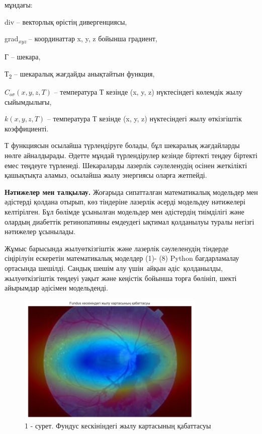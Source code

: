 \begin{multicols}{2}
мұндағы:

div -- векторлық өрістің дивергенциясы,

grad\emph{\textsubscript{xyz}} -- координаттар x, y, z бойынша градиент,

Г -- шекара,

Т\textsubscript{2} -- шекаралық жағдайды анықтайтын функция,

\(C_{o\sigma}(x,y,z,T)\) -- температура Т кезінде (x, y, z) нүктесіндегі
көлемдік жылу сыйымдылығы,

\(k(x,y,z,T)\) -- температура Т кезінде (x, y, z) нүктесіндегі жылу
өткізгіштік коэффициенті.

Т функциясын осылайша түрлендіруге болады, бұл шекаралық жағдайларды
нөлге айналдырады. Әдетте мұндай түрлендірулер кезінде біртекті теңдеу
біртекті емес теңдеуге түрленеді. Шекараларды лазерлік сәулеленудің
осінен жеткілікті қашықтықта аламыз, осылайша жылу энергиясы оларға
жетпейді.

{\bfseries Нәтижелер мен талқылау.} Жоғарыда сипатталған математикалық
модельдер мен әдістерді қолдана отырып, көз тіндеріне лазерлік әсерді
модельдеу нәтижелері келтірілген. Бұл бөлімде ұсынылған модельдер мен
әдістердің тиімділігі және олардың диабеттік ретинопатияны емдеудегі
ықтимал қолданылуы туралы негізгі нәтижелер ұсынылады.

Жұмыс барысында жылуөткізгіштік және лазерлік сәулеленудің тіндерде
сіңірілуін ескеретін математикалық моделдер (1)- (8) Python
бағдарламалау ортасында шешілді. Сандық шешім алу үшін~айқын
әдіс~қолданылды, жылуөткізгіштік теңдеуі уақыт және кеңістік бойынша
торға бөлініп, шекті айырымдар әдісімен модельденді.
\end{multicols}

\begin{figure}[H]
	\centering
	\includegraphics[width=0.8\textwidth]{media/ict/image20}
	\caption*{1 - сурет. Фундус кескініндегі жылу картасының қабаттасуы}
\end{figure}

